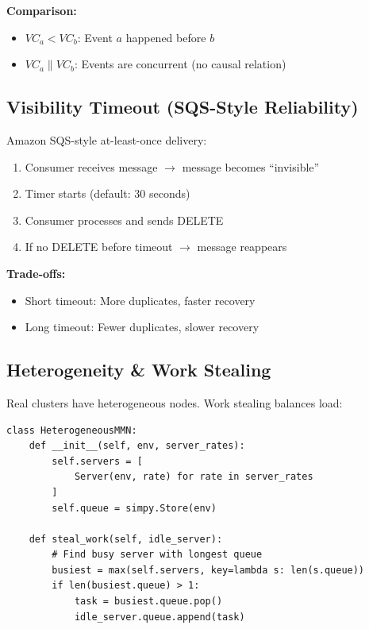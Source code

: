\documentclass[11pt,a4paper]{article}
\begin{document}
\textbf{Comparison:}
\begin{itemize}
    \item $VC_a < VC_b$: Event $a$ happened before $b$
    \item $VC_a \parallel VC_b$: Events are concurrent (no causal relation)
\end{itemize}

\subsection{Visibility Timeout (SQS-Style Reliability)}

Amazon SQS-style at-least-once delivery:

\begin{enumerate}
    \item Consumer receives message $\rightarrow$ message becomes ``invisible''
    \item Timer starts (default: 30 seconds)
    \item Consumer processes and sends DELETE
    \item If no DELETE before timeout $\rightarrow$ message reappears
\end{enumerate}

\textbf{Trade-offs:}
\begin{itemize}
    \item Short timeout: More duplicates, faster recovery
    \item Long timeout: Fewer duplicates, slower recovery
\end{itemize}

\subsection{Heterogeneity \& Work Stealing}

Real clusters have heterogeneous nodes. Work stealing balances load:

\begin{lstlisting}[style=python, caption={Work Stealing Implementation}]
class HeterogeneousMMN:
    def __init__(self, env, server_rates):
        self.servers = [
            Server(env, rate) for rate in server_rates
        ]
        self.queue = simpy.Store(env)
    
    def steal_work(self, idle_server):
        # Find busy server with longest queue
        busiest = max(self.servers, key=lambda s: len(s.queue))
        if len(busiest.queue) > 1:
            task = busiest.queue.pop()
            idle_server.queue.append(task)
\end{lstlisting}
\end{document}
